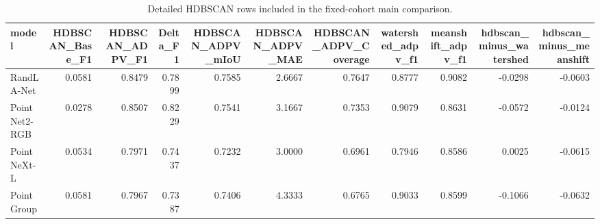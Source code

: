 \begin{table}
\caption{Detailed HDBSCAN rows included in the fixed-cohort main comparison.}
\label{tab:hdbscan_supplementary}
\begin{tabular}{lrrrrrrrrrr}
\toprule
model & HDBSCAN\_Base\_F1 & HDBSCAN\_ADPV\_F1 & Delta\_F1 & HDBSCAN\_ADPV\_mIoU & HDBSCAN\_ADPV\_MAE & HDBSCAN\_ADPV\_Coverage & watershed\_adpv\_f1 & meanshift\_adpv\_f1 & hdbscan\_minus\_watershed & hdbscan\_minus\_meanshift \\
\midrule
RandLA-Net & 0.0581 & 0.8479 & 0.7899 & 0.7585 & 2.6667 & 0.7647 & 0.8777 & 0.9082 & -0.0298 & -0.0603 \\
PointNet2-RGB & 0.0278 & 0.8507 & 0.8229 & 0.7541 & 3.1667 & 0.7353 & 0.9079 & 0.8631 & -0.0572 & -0.0124 \\
PointNeXt-L & 0.0534 & 0.7971 & 0.7437 & 0.7232 & 3.0000 & 0.6961 & 0.7946 & 0.8586 & 0.0025 & -0.0615 \\
PointGroup & 0.0581 & 0.7967 & 0.7387 & 0.7406 & 4.3333 & 0.6765 & 0.9033 & 0.8599 & -0.1066 & -0.0632 \\
\bottomrule
\end{tabular}
\end{table}
